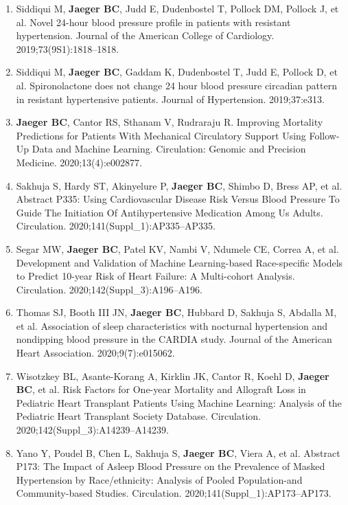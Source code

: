 \documentclass[11pt]{cv_wakeforest_article}
\newcommand{\me}{{\bfseries Jaeger BC}}
\begin{document}
\begin{enumerate}
\item Siddiqui M, \me, Judd E, Dudenbostel T, Pollock DM, Pollock J, et al. Novel 24-hour blood pressure profile in patients with resistant hypertension. Journal of the American College of Cardiology. 2019;73(9S1):1818--1818.

\item Siddiqui M, \me, Gaddam K, Dudenbostel T, Judd E, Pollock D, et al. Spironolactone does not change 24 hour blood pressure circadian pattern in resistant hypertensive patients. Journal of Hypertension. 2019;37:e313.

\item \me, Cantor RS, Sthanam V, Rudraraju R. Improving Mortality Predictions for Patients With Mechanical Circulatory Support Using Follow-Up Data and Machine Learning. Circulation: Genomic and Precision Medicine. 2020;13(4):e002877.

\item Sakhuja S, Hardy ST, Akinyelure P, \me, Shimbo D, Bress AP, et al. Abstract P335: Using Cardiovascular Disease Risk Versus Blood Pressure To Guide The Initiation Of Antihypertensive Medication Among Us Adults. Circulation. 2020;141(Suppl\_1):AP335--AP335.

\item Segar MW, \me, Patel KV, Nambi V, Ndumele CE, Correa A, et al. Development and Validation of Machine Learning-based Race-specific Models to Predict 10-year Risk of Heart Failure: A Multi-cohort Analysis. Circulation. 2020;142(Suppl\_3):A196--A196.

\item Thomas SJ, Booth III JN, \me, Hubbard D, Sakhuja S, Abdalla M, et al. Association of sleep characteristics with nocturnal hypertension and nondipping blood pressure in the CARDIA study. Journal of the American Heart Association. 2020;9(7):e015062.

\item Wisotzkey BL, Asante-Korang A, Kirklin JK, Cantor R, Koehl D, \me, et al. Risk Factors for One-year Mortality and Allograft Loss in Pediatric Heart Transplant Patients Using Machine Learning: Analysis of the Pediatric Heart Transplant Society Database. Circulation. 2020;142(Suppl\_3):A14239--A14239.

\item Yano Y, Poudel B, Chen L, Sakhuja S, \me, Viera A, et al. Abstract P173: The Impact of Asleep Blood Pressure on the Prevalence of Masked Hypertension by Race/ethnicity: Analysis of Pooled Population-and Community-based Studies. Circulation. 2020;141(Suppl\_1):AP173--AP173.


\end{enumerate}
\end{document}
